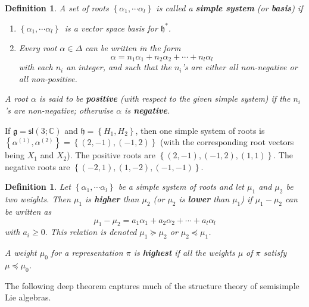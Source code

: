 \documentclass{amsbook}
\let \frak = \mathfrak
\theoremstyle{plain}
\newtheorem{definition}[theorem]{Definition}
\numberwithin{equation}{chapter}
\numberwithin{theorem}{chapter}
\begin{document}
\begin{definition}
A set of roots $\left\{  \alpha_{1},\cdots\alpha_{l}\right\}  $ is called a
\textbf{simple system} (or \textbf{basis}) if

\begin{enumerate}
\item $\left\{  \alpha_{1},\cdots\alpha_{l}\right\}  \,$ is a vector space
basis for $\frak{h}^{\ast}$.

\item  Every root $\alpha\in\Delta$ can be written in the form
\[
\alpha=n_{1}\alpha_{1}+n_{2}\alpha_{2}+\cdots+n_{l}\alpha_{l}%
\]
with each $n_{i}$ an integer, and such that the $n_{i}$'s are either all
non-negative or all non-positive.
\end{enumerate}

A root $\alpha$ is said to be \textbf{positive} (with respect to the given
simple system) if the $n_{i}$'s are non-negative; otherwise $\alpha$ is
\textbf{negative}.
\end{definition}

If $\frak{g}=\mathsf{sl}\left(  3;\mathbb{C}\right)  $ and $\frak{h=}\left\{
H_{1},H_{2}\right\}  $, then one simple system of roots is $\left\{
\alpha^{(1)},\alpha^{(2)}\right\}  =\left\{  \left(  2,-1\right)  ,\left(
-1,2\right)  \right\}  $ (with the corresponding root vectors being $X_{1}$
and $X_{2}$). The positive roots are $\left\{  \left(  2,-1\right)  ,\left(
-1,2\right)  ,\left(  1,1\right)  \right\}  $. The negative roots are
$\left\{  \left(  -2,1\right)  ,\left(  1,-2\right)  ,\left(  -1,-1\right)
\right\}  $.

\begin{definition}
Let $\left\{  \alpha_{1},\cdots\alpha_{l}\right\}  $ be a simple system of
roots and let $\mu_{1}$ and $\mu_{2}$ be two weights. Then $\mu_{1}$ is
\textbf{higher} than $\mu_{2}$ (or $\mu_{2}$ is \textbf{lower} than $\mu_{1}$)
if $\mu_{1}-\mu_{2}$ can be written as
\[
\mu_{1}-\mu_{2}=a_{1}\alpha_{1}+a_{2}\alpha_{2}+\cdots+a_{l}\alpha_{l}%
\]
with $a_{i}\geq0.$ This relation is denoted $\mu_{1}\succeq\mu_{2}$ or
$\mu_{2}\preceq\mu_{1}$.

A weight $\mu_{0}$ for a representation $\pi$ is \textbf{highest} if all the
weights $\mu$ of $\pi$ satisfy $\mu\preceq\mu_{0}$.
\end{definition}

The following deep theorem captures much of the structure theory of semisimple
Lie algebras.
\end{document}
